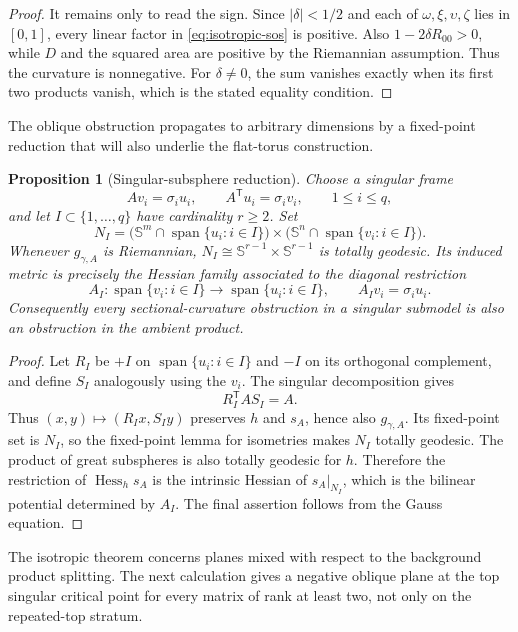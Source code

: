 \documentclass[11pt]{amsart}
\newtheorem{proposition}[theorem]{Proposition}
\theoremstyle{definition}
\theoremstyle{remark}
\DeclareMathOperator{\Hess}{Hess}
\DeclareMathOperator{\spanop}{span}
\newcommand{\Sph}{\mathbb S}
\begin{document}
\begin{proof}
It remains only to read the sign.  Since $|\delta|<1/2$ and each of
$\omega,\xi,\upsilon,\zeta$ lies in $[0,1]$, every linear factor in
\eqref{eq:isotropic-sos} is positive.  Also
$1-2\delta R_{00}>0$, while $D$ and the squared area are positive by
the Riemannian assumption.  Thus the curvature is nonnegative.  For
$\delta\neq0$, the sum vanishes exactly when its first two products
vanish, which is the stated equality condition.
\end{proof}

The oblique obstruction propagates to arbitrary dimensions by a
fixed-point reduction that will also underlie the flat-torus
construction.

\begin{proposition}[Singular-subsphere reduction]
\label{prop:singular-subsphere}
Choose a singular frame
\[
 Av_i=\sigma_i u_i,
 \qquad A^{\mathsf T}u_i=\sigma_i v_i,
 \qquad 1\leq i\leq q,
\]
and let $I\subset\{1,\ldots,q\}$ have cardinality $r\geq2$.  Set
\[
 N_I=
 \bigl(\Sph^m\cap\spanop\{u_i:i\in I\}\bigr)
 \times
 \bigl(\Sph^n\cap\spanop\{v_i:i\in I\}\bigr).
\]
Whenever $g_{\gamma,A}$ is Riemannian, $N_I\cong
\Sph^{r-1}\times\Sph^{r-1}$ is totally geodesic.  Its induced metric
is precisely the Hessian family associated to the diagonal restriction
\[
 A_I:\spanop\{v_i:i\in I\}\longrightarrow
       \spanop\{u_i:i\in I\},
 \qquad A_Iv_i=\sigma_i u_i.
\]
Consequently every sectional-curvature obstruction in a singular
submodel is also an obstruction in the ambient product.
\end{proposition}

\begin{proof}
Let $R_I$ be $+I$ on $\spanop\{u_i:i\in I\}$ and $-I$ on its
orthogonal complement, and define $S_I$ analogously using the $v_i$.
The singular decomposition gives
\[
 R_I^{\mathsf T}AS_I=A.
\]
Thus $(x,y)\mapsto(R_Ix,S_Iy)$ preserves $h$ and $s_A$, hence also
$g_{\gamma,A}$.  Its fixed-point set is $N_I$, so the fixed-point
lemma for isometries makes $N_I$ totally geodesic.  The product of
great subspheres is also totally geodesic for $h$.  Therefore the
restriction of $\Hess_hs_A$ is the intrinsic Hessian of
$s_A|_{N_I}$, which is the bilinear potential determined by $A_I$.
The final assertion follows from the Gauss equation.
\end{proof}

The isotropic theorem concerns planes mixed with respect to the
background product splitting.  The next calculation gives a negative
oblique plane at the top singular critical point for every matrix of
rank at least two, not only on the repeated-top stratum.
\end{document}

